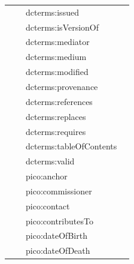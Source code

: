\documentclass[epsfig,a4paper,12pt,titlepage]{book}
\begin{document}
\begin{center}
\begin{table}[h]
\begin{adjustbox}{width=\textwidth}
\begin{tabular}{|p{3.5cm}|p{3.5cm}|p{4.8cm}|p{3.8cm}|}
                     &                      & dcterms:issued                &                                 \\
                     &                      & dcterms:isVersionOf           &                                 \\
                     &                      & dcterms:mediator              &                                 \\
                     &                      & dcterms:medium                &                                 \\
                     &                      & dcterms:modified              &                                 \\
                     &                      & dcterms:provenance            &                                 \\
                     &                      & dcterms:references            &                                 \\
                     &                      & dcterms:replaces              &                                 \\
                     &                      & dcterms:requires              &                                 \\
                     &                      & dcterms:tableOfContents       &                                 \\
                     &                      & dcterms:valid                 &                                 \\
                     &                      & pico:anchor                   &                                 \\
                     &                      & pico:commissioner             &                                 \\
                     &                      & pico:contact                  &                                 \\
                     &                      & pico:contributesTo            &                                 \\
                     &                      & pico:dateOfBirth              &                                 \\
                     &                      & pico:dateOfDeath              &                                 \\

\end{tabular}
\end{adjustbox}
\end{table}
\end{center}
\end{document}
